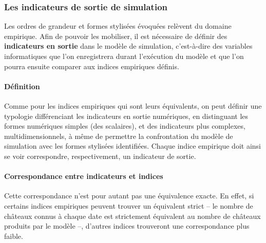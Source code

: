
\subsubsection{Les indicateurs de sortie de simulation}


Les ordres de grandeur et formes stylisées évoquées relèvent du domaine empirique. Afin de pouvoir les mobiliser, il est nécessaire de définir des \textbf{indicateurs en sortie} dans le modèle de simulation, c'est-à-dire des variables informatiques que l'on enregistrera durant l'exécution du modèle et que l'on pourra ensuite comparer aux indices empiriques définis.


\paragraph{Définition}
Comme pour les indices empiriques qui sont leurs équivalents, on peut définir une typologie différenciant les indicateurs en sortie \og numériques\fg{}, en distinguant les formes numériques simples (des scalaires), et des indicateurs plus complexes, multidimensionnels, à même de permettre la confrontation du modèle de simulation avec les formes stylisées identifiées. Chaque indice empirique doit ainsi se voir correspondre, respectivement, un indicateur de sortie.

\paragraph{Correspondance entre indicateurs et indices}\label{para:correspondance}

Cette correspondance n'est pour autant pas une équivalence exacte. En effet, si certains indices empiriques peuvent trouver un équivalent strict -- le nombre de châteaux connus à chaque date est strictement équivalent au nombre de châteaux produits par le modèle --, d'autres indices trouveront une correspondance plus faible.

